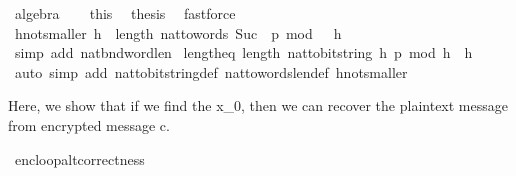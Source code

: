 \begin{isabellebody}
\ algebra\isanewline
\ \ \isamarkupfalse%
\ this\ \isamarkupfalse%
\ {\isacharquery}{\kern0pt}thesis\ \isamarkupfalse%
\ fastforce\isanewline
{}\isamarkupfalse%
%
\endisatagproof
{\isafoldproof}%
%
\isadelimproof
\ \isanewline
%
\endisadelimproof
\isanewline
\isanewline
\ \isanewline
{}\isamarkupfalse%
\ h{\isacharunderscore}{\kern0pt}not{\isacharunderscore}{\kern0pt}smaller{\isacharcolon}{\kern0pt}\ {\isachardoublequoteopen}h\ {\isasymge}\ length\ {\isacharparenleft}{\kern0pt}nat{\isacharunderscore}{\kern0pt}to{\isacharunderscore}{\kern0pt}words\ {\isacharparenleft}{\kern0pt}Suc\ {}{\isacharparenright}{\kern0pt}\ {\isacharparenleft}{\kern0pt}p\ mod\ {}\ {\isacharcircum}{\kern0pt}\ h{\isacharparenright}{\kern0pt}{\isacharparenright}{\kern0pt}{\isachardoublequoteclose}\isanewline
%
\isadelimproof
\ \ %
\endisadelimproof
%
\isatagproof
{}\isamarkupfalse%
\ {\isacharparenleft}{\kern0pt}simp\ add{\isacharcolon}{\kern0pt}\ nat{\isacharunderscore}{\kern0pt}bnd{\isacharunderscore}{\kern0pt}word{\isacharunderscore}{\kern0pt}len{\isacharparenright}{\kern0pt}%
\endisatagproof
{\isafoldproof}%
%
\isadelimproof
\isanewline
%
\endisadelimproof
\isanewline
{}\isamarkupfalse%
\ length{\isacharunderscore}{\kern0pt}eq{\isacharcolon}{\kern0pt}\ {\isachardoublequoteopen}length\ {\isacharparenleft}{\kern0pt}nat{\isacharunderscore}{\kern0pt}to{\isacharunderscore}{\kern0pt}bitstring\ h\ {\isacharparenleft}{\kern0pt}p\ mod\ {}{\isacharcircum}{\kern0pt}h{\isacharparenright}{\kern0pt}{\isacharparenright}{\kern0pt}\ {\isacharequal}{\kern0pt}\ h{\isachardoublequoteclose}\ \isanewline
%
\isadelimproof
\ \ %
\endisadelimproof
%
\isatagproof
{}\isamarkupfalse%
\ {\isacharparenleft}{\kern0pt}auto\ simp\ add{\isacharcolon}{\kern0pt}\ nat{\isacharunderscore}{\kern0pt}to{\isacharunderscore}{\kern0pt}bitstring{\isacharunderscore}{\kern0pt}def\ nat{\isacharunderscore}{\kern0pt}to{\isacharunderscore}{\kern0pt}words{\isacharunderscore}{\kern0pt}len{\isacharunderscore}{\kern0pt}def\ h{\isacharunderscore}{\kern0pt}not{\isacharunderscore}{\kern0pt}smaller{\isacharparenright}{\kern0pt}%
\endisatagproof
{\isafoldproof}%
%
\isadelimproof
%
\endisadelimproof
%
\begin{isamarkuptext}%
Here, we show that if we find the x_0, then we can recover the plaintext message 
    from encrypted message c.%
\end{isamarkuptext}\isamarkuptrue%
\isamarkupfalse%
\ enc{\isacharunderscore}{\kern0pt}loop{\isacharunderscore}{\kern0pt}alt{\isacharunderscore}{\kern0pt}correctness{\isacharcolon}{\kern0pt}\isanewline

\end{isabellebody}
